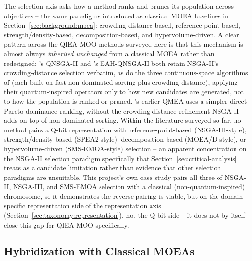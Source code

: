 The selection axis asks how a method ranks and prunes its population
across objectives -- the same paradigms introduced as classical MOEA
baselines in Section~\ref{sec:background:moea}: crowding-distance-based,
reference-point-based, strength/density-based, decomposition-based, and
hypervolume-driven. A clear pattern across the QIEA-MOO methods surveyed
here is that this mechanism is almost always \emph{inherited unchanged}
from a classical MOEA rather than redesigned: \citet{guzel2022qnsga2}'s
QNSGA-II and \citet{kumar2026eahqnsga2}'s EAH-QNSGA-II both retain
NSGA-II's crowding-distance selection verbatim, as do the three
continuous-space algorithms of \citet{olvera2023continuous} (each built
on fast non-dominated sorting plus crowding distance), applying their
quantum-inspired operators only to how new candidates are generated, not
to how the population is ranked or pruned. \citet{kim2006qmea}'s earlier
QMEA uses a simpler direct Pareto-dominance ranking, without the
crowding-distance refinement NSGA-II adds on top of non-dominated
sorting. Within the literature surveyed so far, no method pairs a Q-bit
representation with reference-point-based (NSGA-III-style),
strength/density-based (SPEA2-style), decomposition-based (MOEA/D-style),
or hypervolume-driven (SMS-EMOA-style) selection -- an apparent
concentration on the NSGA-II selection paradigm specifically that
Section~\ref{sec:critical-analysis} treats as a candidate limitation
rather than evidence that other selection paradigms are unsuitable.
This project's own case study pairs all three of NSGA-II, NSGA-III, and
SMS-EMOA selection with a classical (non-quantum-inspired) chromosome,
so it demonstrates the reverse pairing is viable, but on the domain-
specific representation side of the representation axis
(Section~\ref{sec:taxonomy:representation}), not the Q-bit side --
it does not by itself close this gap for QIEA-MOO specifically.

\subsection{Hybridization with Classical MOEAs}
\label{sec:taxonomy:hybridization}

